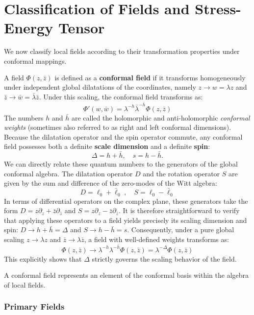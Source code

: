 \section{Classification of Fields and Stress-Energy Tensor}

We now classify local fields according to their transformation properties under conformal mappings.

A field \(\Phi(z, \bar{z})\) is defined as a \textbf{conformal field} if it transforms homogeneously under independent global dilatations of the coordinates, namely \(z \to w = \lambda z\) and \(\bar{z} \to \bar{w} = \bar{\lambda} \bar{z}\). Under this scaling, the conformal field transforms as:
\[
    \Phi'(w, \bar{w}) = \lambda^{-h} \bar{\lambda}^{-\bar{h}} \Phi(z, \bar{z})
\]
The numbers \(h\) and \(\bar{h}\) are called the holomorphic and anti-holomorphic \textit{conformal weights} (sometimes also referred to as right and left conformal dimensions). Because the dilatation operator and the spin operator commute, any conformal field possesses both a definite \textbf{scale dimension} and a definite \textbf{spin}:
\[
    \Delta = h + \bar{h}, \quad s = h - \bar{h}.
\]
We can directly relate these quantum numbers to the generators of the global conformal algebra. The dilatation operator \(D\) and the rotation operator \(S\) are given by the sum and difference of the zero-modes of the Witt algebra:
\[
    D = \ell_0 + \bar{\ell}_0 \;, \quad S = \ell_0 - \bar{\ell}_0
\]
In terms of differential operators on the complex plane, these generators take the form \(D = z\partial_z + \bar{z}\partial_{\bar{z}}\) and \(S = z\partial_z - \bar{z}\partial_{\bar{z}}\). It is therefore straightforward to verify that applying these operators to a field yields precisely its scaling dimension and spin: \(D \to h + \bar{h} = \Delta\) and \(S \to h - \bar{h} = s\).
Consequently, under a pure global scaling \(z \to \lambda z\) and \(\bar{z} \to \lambda \bar{z}\), a field with well-defined weights transforms as:
\[
    \Phi(z, \bar{z}) \to \lambda^{-h} \lambda^{-\bar{h}} \Phi(z, \bar{z}) = \lambda^{-\Delta} \Phi(z, \bar{z})
\]
This explicitly shows that \(\Delta\) strictly governs the scaling behavior of the field.

A conformal field represents an element of the conformal basis within the algebra of local fields.

\subsubsection{Primary Fields}

